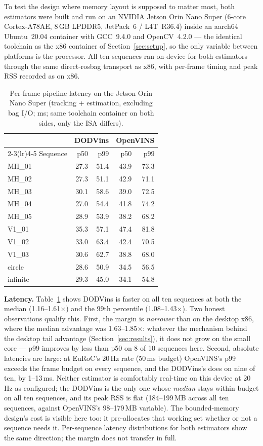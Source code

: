 \documentclass[10pt,conference,letterpaper]{IEEEtran}
\begin{document}
To test the design where memory layout is supposed to matter most, both
estimators were built and run on an NVIDIA Jetson Orin Nano Super (6-core
Cortex-A78AE, 8\,GB LPDDR5, JetPack~6 / L4T~R36.4) inside an aarch64
Ubuntu~20.04 container with GCC~9.4.0 and OpenCV~4.2.0 --- the identical
toolchain as the x86 container of Section~\ref{sec:setup}, so the only
variable between platforms is the processor. All ten sequences ran
on-device for both estimators through the same direct-rosbag transport as
x86, with per-frame timing and peak RSS recorded as on x86.

\begin{table}[t]
\caption{Per-frame pipeline latency on the Jetson Orin Nano Super
(tracking + estimation, excluding bag I/O; ms; same toolchain container on
both sides, only the ISA differs).}
\label{tab:aarch64-latency}
\centering
\begin{tabular}{lrrrr}
\toprule
 & \multicolumn{2}{c}{DODVins} & \multicolumn{2}{c}{OpenVINS} \\
\cmidrule(lr){2-3}\cmidrule(lr){4-5}
Sequence & p50 & p99 & p50 & p99 \\
\midrule
MH\_01   & 27.3 & 51.4 & 43.9 & 73.3 \\
MH\_02   & 27.3 & 51.1 & 42.9 & 71.1 \\
MH\_03   & 30.1 & 58.6 & 39.0 & 72.5 \\
MH\_04   & 27.0 & 54.4 & 41.8 & 74.2 \\
MH\_05   & 28.9 & 53.9 & 38.2 & 68.2 \\
V1\_01   & 35.3 & 57.1 & 47.4 & 81.8 \\
V1\_02   & 33.0 & 63.4 & 42.4 & 70.5 \\
V1\_03   & 30.6 & 62.7 & 38.8 & 68.0 \\
circle   & 28.6 & 50.9 & 34.5 & 56.5 \\
infinite & 29.3 & 45.0 & 34.1 & 54.8 \\
\bottomrule
\end{tabular}
\end{table}

\textbf{Latency.} Table~\ref{tab:aarch64-latency} shows DODVins
is faster on all ten sequences at both the median (1.16--1.61$\times$) and
the 99th percentile (1.08--1.43$\times$). Two honest observations qualify
this. First, the margin is \emph{narrower} than on the desktop x86, where
the median advantage was 1.63--1.85$\times$: whatever the mechanism behind
the desktop tail advantage (Section~\ref{sec:results}), it does not grow on
the small core --- p99 improves by less than p50 on 8 of 10 sequences here.
Second, absolute latencies are large: at EuRoC's 20\,Hz rate (50\,ms budget)
OpenVINS's p99 exceeds the frame budget on every sequence, and the
DODVins's does on nine of ten, by 1--13\,ms. Neither estimator is
comfortably real-time on this device at 20\,Hz as configured; the
DODVins is the only one whose \emph{median} stays within budget on
all ten sequences, and its peak RSS is flat (184--199\,MB across all ten
sequences, against OpenVINS's 98--179\,MB variable). The bounded-memory
design's cost is visible here too: it pre-allocates that working set whether
or not a sequence needs it. Per-sequence latency distributions for both estimators show the same
direction; the margin does not transfer in full.
\end{document}
